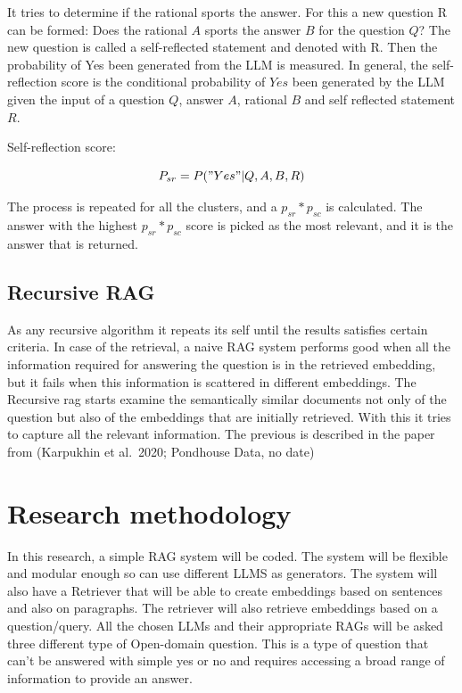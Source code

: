 \documentclass{wseas}
\begin{document}
It tries to determine if the rational sports the answer. For this a new
question R can be formed: Does the rational $A$ sports the answer
$B$ for the question $Q$? The new question is called a
self-reflected statement and denoted with R. Then the probability of Yes
been generated from the LLM is measured. In general, the self-reflection
score is the conditional probability of $Yes$ been generated by the
LLM given the input of a question $Q$, answer $A$, rational $B$ and self
reflected statement $R$.

Self-reflection score: 

\begin{equation}
  P_{sr} = P("Yes"|Q, A, B, R)  
\end{equation}

The process is repeated for all the clusters, and a \(p_{sr}*p_{sc}\) is
calculated. The answer with the highest \(p_{sr}*p_{sc}\) score is
picked as the most relevant, and it is the answer that is returned.


\subsection{Recursive RAG}

As any recursive algorithm it repeats its self until the results
satisfies certain criteria. In case of the retrieval, a naive RAG system
performs good when all the information required for answering the
question is in the retrieved embedding, but it fails when this
information is scattered in different embeddings. The Recursive rag
starts examine the semantically similar documents not only of the
question but also of the embeddings that are initially retrieved. With
this it tries to capture all the relevant information. The previous is
described in the paper from (Karpukhin et al.~2020; Pondhouse Data, no
date) \cite{cite16} \cite{cite17}


\section{Research methodology}

In this research, a simple RAG system will be coded. The system will be
flexible and modular enough so can use different LLMS as generators. The
system will also have a Retriever that will be able to create embeddings
based on sentences and also on paragraphs. The retriever will also
retrieve embeddings based on a question/query. All the chosen LLMs and
their appropriate RAGs will be asked three different type of Open-domain
question. This is a type of question that can't be answered with simple
yes or no and requires accessing a broad range of information to provide
an answer.
\end{document}
